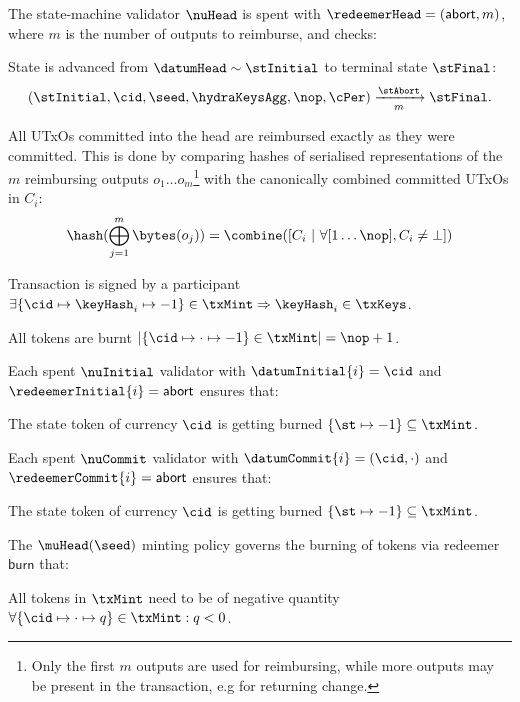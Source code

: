 \begin{samepage}
	\noindent The state-machine validator $\nuHead$ is spent with
	$\redeemerHead = (\mathsf{abort}, m)$, where $m$ is the number of outputs to
	reimburse, and checks:
	\begin{menumerate}
		\item State is advanced from $\datumHead \sim \stInitial$ to terminal state
		$\stFinal$: %
		\[
			(\stInitial,\cid,\seed,\hydraKeysAgg,\nop,\cPer) \xrightarrow[m]{\stAbort} \stFinal.
		\]
		\item All UTxOs committed into the head are reimbursed exactly as they were
		committed. This is done by comparing hashes of serialised representations of
		the $m$ reimbursing outputs $o_{1} \dots o_{m}$\footnote{Only the first $m$
			outputs are used for reimbursing, while more outputs may be present in the
			transaction, e.g for returning change.} with the canonically combined
		committed UTxOs in $C_{i}$:
		\[
			\hash(\bigoplus_{j=1}^{m} \bytes(o_{j})) = \combine([C_{i} ~ | ~ \forall [1\dots\nop], C_{i} \neq \bot])
		\]

		\item Transaction is signed by a participant $\exists \{\cid \mapsto \keyHash_{i} \mapsto -1\} \in \txMint \Rightarrow \keyHash_{i} \in \txKeys$.
		\item All tokens are burnt
		$|\{\cid \mapsto \cdot \mapsto -1\} \in \txMint| = \nop + 1$.
	\end{menumerate}
\end{samepage}

\noindent Each spent $\nuInitial$ validator with $\datumInitial{i} = \cid$ and $\redeemerInitial{i} = \mathsf{abort}$ ensures that:
\begin{menumerate}
	\item The state token of currency $\cid$ is getting burned $\{\st \mapsto -1\} \subseteq \txMint$.
\end{menumerate}

\noindent Each spent $\nuCommit$ validator with $\datumCommit{i} = (\cid,\cdot)$ and $\redeemerCommit{i} = \mathsf{abort}$ ensures that:
\begin{menumerate}
	\item The state token of currency $\cid$ is getting burned $\{\st \mapsto -1\} \subseteq \txMint$.
\end{menumerate}

\noindent The $\muHead(\seed)$ minting policy governs the burning of tokens via
redeemer $\mathsf{burn}$ that:
\begin{menumerate}
	\item All tokens in $\txMint$ need to be of negative quantity
	$\forall \{\cid \mapsto \cdot \mapsto q\} \in \txMint : q < 0$.
\end{menumerate}

